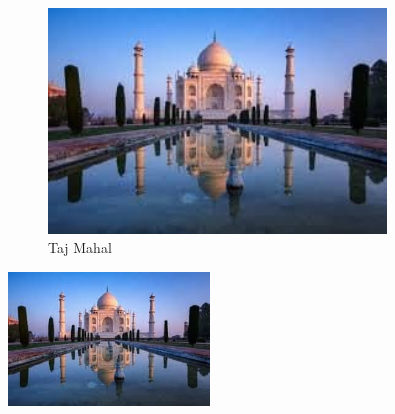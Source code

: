 \documentclass{article}
\begin{document}
	
	
	\begin{figure}[h!]											%
		\centering												%
		\includegraphics[width=0.8\textwidth]{images/taj.jpg}   %
		\caption{Taj Mahal}										%
		\label{taj}												%
	\end{figure}

	\includegraphics[width=0.4\textwidth]{images/taj.jpg}\\  

\end{document}
